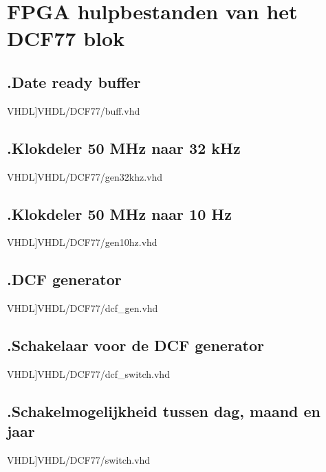\section{FPGA hulpbestanden van het DCF77 blok}
\label{Ap: FPGA_dcftest}
\subsection*{\label{code: fpga_buff}\thesubsection.\quad Date ready buffer}
\scriptsize 
 VHDL]{VHDL/DCF77/buff.vhd}
\normalsize

\subsection*{\label{code: fpga_gen32khz}\thesubsection.\quad Klokdeler 50 MHz naar 32 kHz}
\scriptsize 
 VHDL]{VHDL/DCF77/gen32khz.vhd}
\normalsize

\subsection*{\label{code: fpga_gen10hz}\thesubsection.\quad Klokdeler 50 MHz naar 10 Hz}
\scriptsize 
 VHDL]{VHDL/DCF77/gen10hz.vhd}
\normalsize

\subsection*{\label{code: fpga_dcfgen}\thesubsection.\quad DCF generator}
\scriptsize 
 VHDL]{VHDL/DCF77/dcf_gen.vhd}
\normalsize

\subsection*{\label{code: fpga_dcfswitch}\thesubsection.\quad Schakelaar voor de DCF generator}
\scriptsize 
 VHDL]{VHDL/DCF77/dcf_switch.vhd}
\normalsize

\subsection*{\label{code: fpga_switch}\thesubsection.\quad Schakelmogelijkheid tussen dag, maand en jaar}
\scriptsize 
 VHDL]{VHDL/DCF77/switch.vhd}
\normalsize

